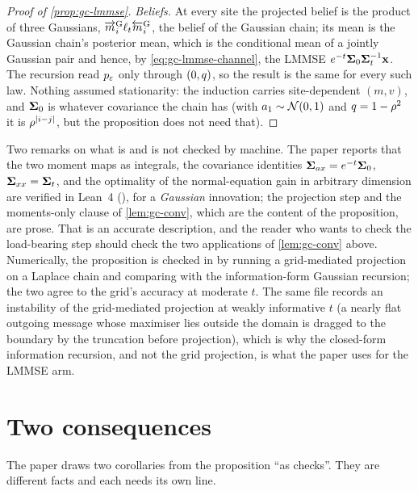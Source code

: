 \begin{proof}[Proof of \cref{prop:gc-lmmse}]
\emph{Beliefs.} At every site the projected belief is the product of three Gaussians,
$\overrightarrow{m}^{\mathrm G}_i\ell_t\overleftarrow{m}^{\mathrm G}_i$, the belief of the Gaussian chain; its mean is
the Gaussian chain's posterior mean, which is the conditional mean of a jointly Gaussian
pair and hence, by \cref{eq:gc-lmmse-channel}, the LMMSE $e^{-t}\mathbf{\Sigma}_0\mathbf{\Sigma}_t^{-1}\mathbf{x}$.
The recursion read $p_{\varepsilon}$ only through $(0,q)$, so the result is the same for
every such law. Nothing assumed stationarity: the induction carries site-dependent
$(m,v)$, and $\mathbf{\Sigma}_0$ is whatever covariance the chain has (with $a_1\sim\mathcal{N}\!\left(0,1\right)$ and
$q=1-\rho^2$ it is $\rho^{|i-j|}$, but the proposition does not need that).
\end{proof}

Two remarks on what is and is not checked by machine. The paper reports that the two
moment maps as integrals, the covariance identities $\mathbf{\Sigma}_{ax}=e^{-t}\mathbf{\Sigma}_0$,
$\mathbf{\Sigma}_{xx}=\mathbf{\Sigma}_t$, and the optimality of the normal-equation gain in arbitrary dimension
are verified in Lean~4 (), for a \emph{Gaussian} innovation; the
projection step and the moments-only clause of \cref{lem:gc-conv}, which are the
content of the proposition, are prose. That is an accurate description, and the reader
who wants to check the load-bearing step should check the two applications of
\cref{lem:gc-conv} above. Numerically, the proposition is checked in
 by running a grid-mediated projection on
a Laplace chain and comparing with the information-form Gaussian recursion; the two
agree to the grid's accuracy at moderate $t$. The same file records an instability of
the grid-mediated projection at weakly informative $t$ (a nearly flat outgoing
message whose maximiser lies outside the domain is dragged to the boundary by the
truncation before projection), which is why the closed-form information recursion,
and not the grid projection, is what the paper uses for the LMMSE arm.

\section{Two consequences}

The paper draws two corollaries from the proposition ``as checks''. They are different
facts and each needs its own line.

